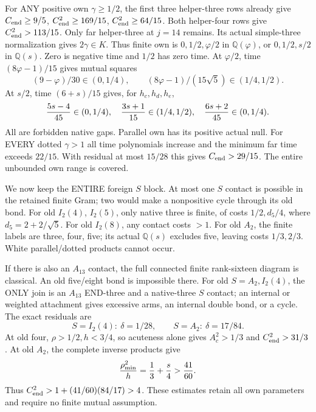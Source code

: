 For ANY positive own \(\gamma\ge1/2\),
the first three helper-three rows already
give \(C_{\rm end}\ge9/5\),
\(C_{\rm end}^2\ge169/15\),
\(C_{\rm end}^2\ge64/15\).
Both helper-four rows give
\(C_{\rm end}^2>113/15\).
Only far helper-three at \(j=14\) remains.
Its actual simple-three normalization gives
\(2\gamma\in K\).
Thus finite own is
\(0,1/2,\varphi/2\) in \(\mathbb Q(\varphi)\),
or \(0,1/2,s/2\) in \(\mathbb Q(s)\).
Zero is negative time and \(1/2\) has zero
time.  At \(\varphi/2\), time
\((8\varphi-1)/15\) gives mutual squares
\[
        (9-\varphi)/30\in(0,1/4),\qquad
       (8\varphi-1)/(15\sqrt5)\in(1/4,1/2) .
\]
At \(s/2\), time \((6+s)/15\) gives,
for \(h_c,h_d,h_e\),
\[
 {5s-4\over45}\in(0,1/4),\quad
 {3s+1\over15}\in(1/4,1/2),\quad
 {6s+2\over45}\in(0,1/4) .
\]
All are forbidden native gaps.
Parallel own has its positive actual null.
For EVERY dotted \(\gamma>1\) all time
polynomials increase and the minimum far
time exceeds \(22/15\).
With residual at most \(15/28\) this gives
\(C_{\rm end}>29/15\).
The entire unbounded own range is covered.

We now keep the ENTIRE foreign \(S\) block.
At most one \(S\) contact is possible in
the retained finite Gram; two would make
a nonpositive cycle through its old bond.
For old \(I_2(4)\), \(I_2(5)\), only native
three is finite, of costs \(1/2,d_5/4\),
where \(d_5=2+2/\sqrt5\).
For old \(I_2(8)\), any contact costs \(>1\).
For old \(A_2\), the finite labels are
three, four, five; its actual \(\mathbb Q(s)\)
excludes five, leaving costs \(1/3,2/3\).
White parallel/dotted products cannot occur.

If there is also an \(A_{13}\) contact,
the full connected finite rank-sixteen
diagram is classical.
An old five/eight bond is impossible there.
For old \(S=A_2,I_2(4)\), the ONLY join is
an \(A_{13}\) END-three and a native-three
\(S\) contact; an internal or weighted
attachment gives excessive arms, an internal
double bond, or a cycle.
The exact residuals are
\[
                    S=I_2(4):\ \delta=1/28,\qquad
                    S=A_2:\ \delta=17/84 .
\]
At old four, \(\rho>1/2,h<3/4\), so
acuteness alone gives \(A_c^2>1/3\) and
\(C_{\rm end}^2>31/3\).
At old \(A_2\), the complete inverse products
give
\[
                   {\rho_{\min}^2\over h}
                       ={1\over3}+{s\over4}>{41\over60}.
\]
Thus \(C_{\rm end}^2>1+(41/60)(84/17)>4\).
These estimates retain all own parameters
and require no finite mutual assumption.

